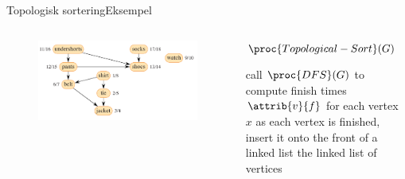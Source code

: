 \documentclass[aspectratio=1610]{beamer}
\begin{document}
\begin{frame}{Topologisk sortering}{Eksempel}
    \begin{columns}
        \begin{figure}[h]
            \centering
            \includegraphics[width=\columnwidth]{topo-dag}
        \end{figure}

        \begin{block}{$\proc{Topological-Sort}(G)$}
            \footnotesize
        
            \vspace{-\abovedisplayskip}
            \begin{codebox}
                \li call $\proc{DFS}(G)$ to compute
                \>      finish times $\attrib{v}{f}$  for each vertex $x$
                \Stopalign
                \li as each vertex is finished, insert
                \>       it onto the front of a linked list
                \Stopalign
                \li \Return the linked list of vertices
            \end{codebox}
        \end{block}
    \end{columns}


\end{frame}
\end{document}
